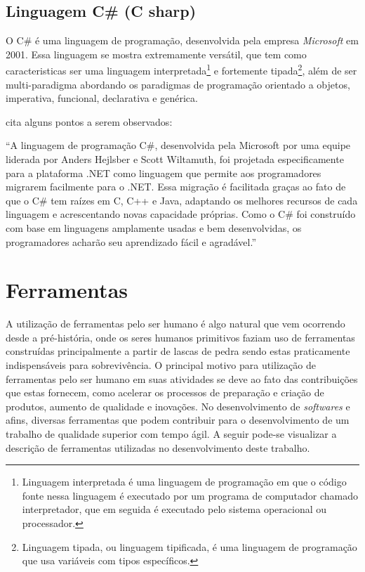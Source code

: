 \documentclass[
	12pt,				%
    oneside,			%
	a4paper,			%
	english,			%
	french,				%
	spanish,			%
	brazil,				%
	]{abntex2}
\begin{document}
	\subsection{Linguagem C\# (C sharp)}
		O C\# é uma linguagem de programação, desenvolvida pela empresa \textit{Microsoft} em 2001. Essa linguagem se mostra extremamente versátil, que tem como caracteristicas ser uma linguagem interpretada\footnote{Linguagem interpretada é uma linguagem de programação em que o código fonte nessa linguagem é executado por um programa de computador chamado interpretador, que em seguida é executado pelo sistema operacional ou processador.} e fortemente tipada\footnote{Linguagem tipada, ou linguagem tipificada, é uma linguagem de programação que usa variáveis com tipos específicos.}, além de ser multi-paradigma abordando os paradigmas de programação orientado a objetos, imperativa, funcional, declarativa e genérica.
		
		 cita alguns pontos a serem observados:
		\begin{citacao}
			“A linguagem de programação C\#, desenvolvida pela Microsoft por uma equipe liderada por Anders Hejlsber e Scott Wiltamuth, foi projetada especificamente para a plataforma .NET como linguagem que permite aos programadores migrarem facilmente para o .NET. Essa migração é facilitada graças ao fato de que o C\# tem raízes em C, C++ e Java, adaptando os melhores recursos de cada linguagem e acrescentando novas capacidade próprias. Como o C\# foi construído com base em linguagens amplamente usadas e bem desenvolvidas, os programadores acharão seu aprendizado fácil e agradável.”
		\end{citacao}
	
	\section{Ferramentas}
	
		A utilização de ferramentas pelo ser humano é algo natural que vem ocorrendo desde a pré-história, onde os seres humanos primitivos faziam uso de ferramentas construídas principalmente a partir de lascas de pedra sendo estas praticamente indispensáveis para sobrevivência. O principal motivo para utilização de ferramentas pelo ser humano em suas atividades se deve ao fato das contribuições que estas fornecem, como acelerar os processos de preparação e criação de produtos, aumento de qualidade e inovações. No desenvolvimento de \textit{softwares} e afins, diversas ferramentas que podem contribuir para o desenvolvimento de um trabalho de qualidade superior com tempo ágil. A seguir pode-se visualizar a descrição de ferramentas utilizadas no desenvolvimento deste trabalho.
		
\end{document}
